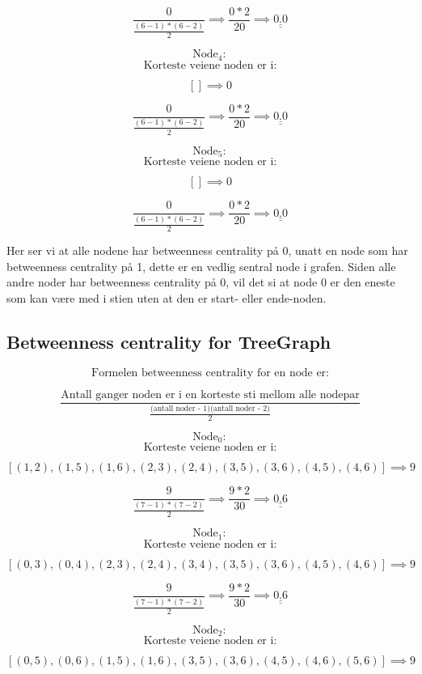 \documentclass[11pt]{article}
\begin{document}
\[ \frac{0}{\frac{(6-1)*(6-2)}{2}} \implies \frac{0*2}{20} \implies \underline{\underline{ 0.0 }}\]

\[\text{Node}_4:\] \[\text{Korteste veiene noden er i:}\]

\[ [] \implies 0 \]

\[ \frac{0}{\frac{(6-1)*(6-2)}{2}} \implies \frac{0*2}{20} \implies \underline{\underline{ 0.0 }}\]

\[\text{Node}_5:\] \[\text{Korteste veiene noden er i:}\]

\[ [] \implies 0 \]

\[ \frac{0}{\frac{(6-1)*(6-2)}{2}} \implies \frac{0*2}{20} \implies \underline{\underline{ 0.0 }}\]

Her ser vi at alle nodene har betweenness centrality på 0, unatt en node
som har betweenness centrality på 1, dette er en vedlig sentral node i
grafen. Siden alle andre noder har betweenness centrality på 0, vil det
si at node 0 er den eneste som kan være med i stien uten at den er
start- eller ende-noden.

    \hypertarget{betweenness-centrality-for-treegraph}{%
\subsection*{Betweenness centrality for
TreeGraph}\label{betweenness-centrality-for-treegraph}}

\[\text{Formelen betweenness centrality for en node er:}\]

\[\frac{\text{Antall ganger noden er i en korteste sti mellom alle nodepar}}{\frac{\text{(antall noder - 1)(antall noder - 2)}}{2}}\]

\[\text{Node}_0:\] \[\text{Korteste veiene noden er i:}\]

\[ [(1, 2), (1, 5), (1, 6), (2, 3), (2, 4), (3, 5), (3, 6), (4, 5), (4, 6)] \implies 9 \]

\[ \frac{9}{\frac{(7-1)*(7-2)}{2}} \implies \frac{9*2}{30} \implies \underline{\underline{ 0.6 }}\]

\[\text{Node}_1:\] \[\text{Korteste veiene noden er i:}\]

\[ [(0, 3), (0, 4), (2, 3), (2, 4), (3, 4), (3, 5), (3, 6), (4, 5), (4, 6)] \implies 9 \]

\[ \frac{9}{\frac{(7-1)*(7-2)}{2}} \implies \frac{9*2}{30} \implies \underline{\underline{ 0.6 }}\]

\[\text{Node}_2:\] \[\text{Korteste veiene noden er i:}\]

\[ [(0, 5), (0, 6), (1, 5), (1, 6), (3, 5), (3, 6), (4, 5), (4, 6), (5, 6)] \implies 9 \]
\end{document}
